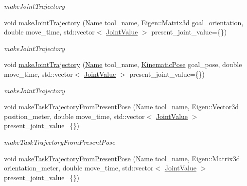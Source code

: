 \begin{DoxyCompactItemize}
\begin{DoxyCompactList}\small\item\em make\+Joint\+Trajectory \end{DoxyCompactList}\item 
void \hyperlink{classrobotis__manipulator_1_1_robotis_manipulator_a4e1a59e031ed7787fb6142fb82d69309}{make\+Joint\+Trajectory} (\hyperlink{namespacerobotis__manipulator_a08c2d25e77a01ad75b9bb740f8ce4765}{Name} tool\+\_\+name, Eigen\+::\+Matrix3d goal\+\_\+orientation, double move\+\_\+time, std\+::vector$<$ \hyperlink{namespacerobotis__manipulator_aa0556c98c5294ccf3a96c2d0fe315e40}{Joint\+Value} $>$ present\+\_\+joint\+\_\+value=\{\})
\begin{DoxyCompactList}\small\item\em make\+Joint\+Trajectory \end{DoxyCompactList}\item 
void \hyperlink{classrobotis__manipulator_1_1_robotis_manipulator_a1ffbc317192844724befed3cd8b65c10}{make\+Joint\+Trajectory} (\hyperlink{namespacerobotis__manipulator_a08c2d25e77a01ad75b9bb740f8ce4765}{Name} tool\+\_\+name, \hyperlink{structrobotis__manipulator_1_1_kinematic_pose}{Kinematic\+Pose} goal\+\_\+pose, double move\+\_\+time, std\+::vector$<$ \hyperlink{namespacerobotis__manipulator_aa0556c98c5294ccf3a96c2d0fe315e40}{Joint\+Value} $>$ present\+\_\+joint\+\_\+value=\{\})
\begin{DoxyCompactList}\small\item\em make\+Joint\+Trajectory \end{DoxyCompactList}\item 
void \hyperlink{classrobotis__manipulator_1_1_robotis_manipulator_a7c8796fb8230da8e8151abc96a276d2c}{make\+Task\+Trajectory\+From\+Present\+Pose} (\hyperlink{namespacerobotis__manipulator_a08c2d25e77a01ad75b9bb740f8ce4765}{Name} tool\+\_\+name, Eigen\+::\+Vector3d position\+\_\+meter, double move\+\_\+time, std\+::vector$<$ \hyperlink{namespacerobotis__manipulator_aa0556c98c5294ccf3a96c2d0fe315e40}{Joint\+Value} $>$ present\+\_\+joint\+\_\+value=\{\})
\begin{DoxyCompactList}\small\item\em make\+Task\+Trajectory\+From\+Present\+Pose \end{DoxyCompactList}\item 
void \hyperlink{classrobotis__manipulator_1_1_robotis_manipulator_a09bb31cb32445db61006ae73e05c4d81}{make\+Task\+Trajectory\+From\+Present\+Pose} (\hyperlink{namespacerobotis__manipulator_a08c2d25e77a01ad75b9bb740f8ce4765}{Name} tool\+\_\+name, Eigen\+::\+Matrix3d orientation\+\_\+meter, double move\+\_\+time, std\+::vector$<$ \hyperlink{namespacerobotis__manipulator_aa0556c98c5294ccf3a96c2d0fe315e40}{Joint\+Value} $>$ present\+\_\+joint\+\_\+value=\{\})

\end{DoxyCompactItemize}
